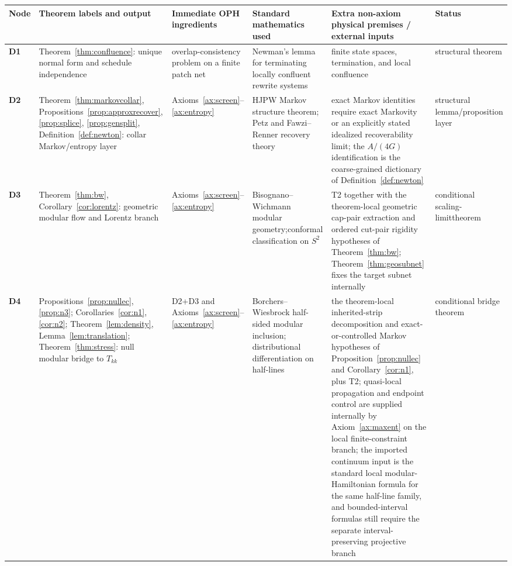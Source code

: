 \documentclass[11pt]{article}
\begin{document}
\begingroup
\scriptsize
\setlength{\tabcolsep}{1pt}
\begin{longtable}{@{}>{\raggedright\arraybackslash}p{}>{\raggedright\arraybackslash}p{}>{\raggedright\arraybackslash}p{}>{\raggedright\arraybackslash}p{}>{\raggedright\arraybackslash}p{}>{\raggedright\arraybackslash}p{}@{}}
\toprule
Node & Theorem labels and output & Immediate OPH ingredients & Standard mathematics used & Extra non-axiom physical premises / external inputs & Status \\
\midrule
\endhead
\bottomrule
\endfoot
\textbf{D1} & Theorem~\ref{thm:confluence}: unique normal form and schedule independence & overlap-consistency problem on a finite patch net & Newman's lemma for terminating locally confluent rewrite systems & finite state spaces, termination, and local confluence & structural theorem \\
\textbf{D2} & Theorem~\ref{thm:markovcollar}, Propositions~\ref{prop:approxrecover}, \ref{prop:splice}, \ref{prop:gensplit}, Definition~\ref{def:newton}: collar Markov/entropy layer & Axioms~\ref{ax:screen}--\ref{ax:entropy} & HJPW Markov structure theorem; Petz and Fawzi--Renner recovery theory & exact Markov identities require exact Markovity or an explicitly stated idealized recoverability limit; the \(A/(4G)\) identification is the coarse-grained dictionary of Definition~\ref{def:newton} & structural lemma/\newline proposition layer \\
\textbf{D3} & Theorem~\ref{thm:bw}, Corollary~\ref{cor:lorentz}: geometric modular flow and Lorentz branch & Axioms~\ref{ax:screen}--\ref{ax:entropy} & Bisognano--Wichmann modular geometry;\newline conformal classification on \(S^2\) & T2 together with the theorem-local geometric cap-pair extraction and ordered cut-pair rigidity hypotheses of Theorem~\ref{thm:bw}; Theorem~\ref{thm:geosubnet} fixes the target subnet internally & conditional scaling-limit\newline theorem \\
\textbf{D4} & Propositions~\ref{prop:nullec}, \ref{prop:n3}; Corollaries~\ref{cor:n1}, \ref{cor:n2}; Theorem~\ref{lem:density}, Lemma~\ref{lem:translation}; Theorem~\ref{thm:stress}: null modular bridge to \(T_{kk}\) & D2+D3 and Axioms~\ref{ax:screen}--\ref{ax:entropy} & Borchers--Wiesbrock half-sided modular inclusion; distributional differentiation on half-lines & the theorem-local inherited-strip decomposition and exact-or-controlled Markov hypotheses of Proposition~\ref{prop:nullec} and Corollary~\ref{cor:n1}, plus T2; quasi-local propagation and endpoint control are supplied internally by Axiom~\ref{ax:maxent} on the local finite-constraint branch; the imported continuum input is the standard local modular-Hamiltonian formula for the same half-line family, and bounded-interval formulas still require the separate interval-preserving projective branch & conditional bridge theorem \\

\end{longtable}
\end{document}
